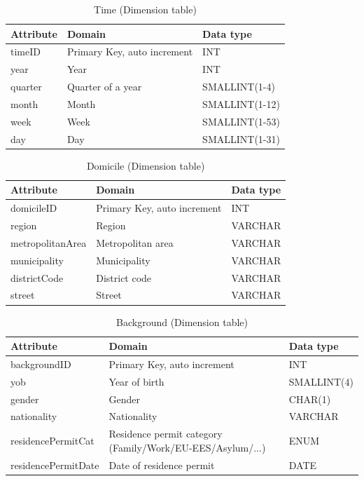 \begin{table}[htbp]
  \centering
  \caption{Time (Dimension table)}
  \begin{tabular}{|l|l|l|}
    \hline
    \textbf{Attribute} & \textbf{Domain} & \textbf{Data type} \\
    \hline
    timeID & Primary Key, auto increment & INT \\
    \hline
    year & Year & INT \\
    \hline
    quarter & Quarter of a year & SMALLINT(1-4) \\
    \hline
    month & Month & SMALLINT(1-12) \\
    \hline
    week & Week & SMALLINT(1-53) \\
    \hline
    day & Day & SMALLINT(1-31) \\
    \hline
  \end{tabular}
\end{table}

\begin{table}[htbp]
  \centering
  \caption{Domicile (Dimension table)}
  \begin{tabular}{|l|l|l|}
    \hline
    \textbf{Attribute} & \textbf{Domain} & \textbf{Data type} \\
    \hline
    domicileID & Primary Key, auto increment & INT \\
    \hline
    region & Region & VARCHAR \\
    \hline
    metropolitanArea & Metropolitan area & VARCHAR \\
    \hline
    municipality & Municipality & VARCHAR \\
    \hline
    districtCode & District code & VARCHAR \\
    \hline
    street & Street & VARCHAR \\
    \hline
  \end{tabular}
\end{table}

\begin{table}[htbp]
  \centering
  \caption{Background (Dimension table)}
  \begin{tabular}{|l|l|l|}
    \hline
    \textbf{Attribute} & \textbf{Domain} & \textbf{Data type} \\
    \hline
    backgroundID & Primary Key, auto increment & INT \\
    \hline
    yob & Year of birth & SMALLINT(4) \\
    \hline
    gender & Gender & CHAR(1) \\
    \hline
    nationality & Nationality & VARCHAR \\
    \hline
    residencePermitCat & Residence permit category (Family/Work/EU-EES/Asylum/...) & ENUM \\
    \hline
    residencePermitDate & Date of residence permit & DATE \\
    \hline
  \end{tabular}
\end{table}

